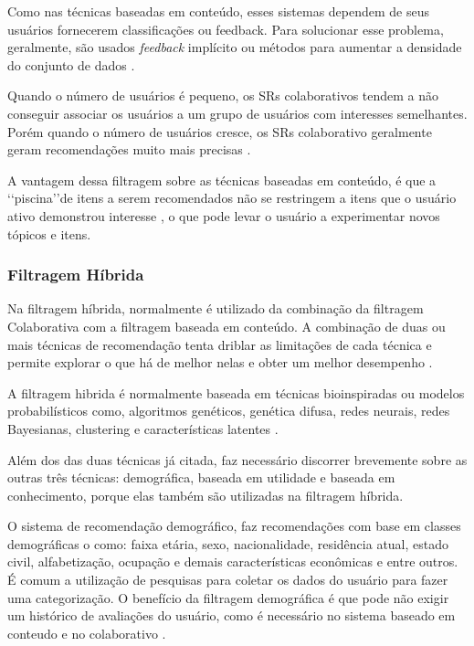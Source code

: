 Como nas técnicas baseadas em conteúdo, esses sistemas dependem de seus usuários fornecerem classificações ou feedback. Para solucionar 
esse problema, geralmente, são usados \emph{feedback} implícito ou métodos para aumentar 
a densidade do conjunto de dados \cite{paulson2003}.

Quando o número de usuários é pequeno, os SRs colaborativos tendem a não conseguir associar 
os usuários a um grupo de usuários com interesses semelhantes. Porém quando o 
número de usuários cresce, os SRs colaborativo geralmente geram recomendações muito mais 
precisas \cite{mauricio}. 

A vantagem dessa filtragem sobre as técnicas baseadas em conteúdo, é que a \lq\lq piscina\rq\rq  de itens a serem recomendados 
não se restringem a itens que o usuário ativo demonstrou interesse \cite{paulson2003}, o que pode levar o usuário a experimentar novos tópicos e itens.


\subsubsection{Filtragem Híbrida}

Na filtragem híbrida, normalmente é utilizado da combinação da filtragem Colaborativa com a filtragem 
baseada em conteúdo\cite{bobadilla2013}. A combinação de duas ou mais técnicas de recomendação tenta driblar as limitações de cada 
técnica e permite explorar o que há de melhor nelas e obter um melhor desempenho \cite{burke2002}. 

A filtragem hibrida é normalmente baseada em técnicas bioinspiradas ou modelos probabilísticos como, 
algoritmos genéticos, genética difusa, redes neurais, redes Bayesianas, clustering e características latentes  \cite{bobadilla2013}.

Além dos das duas técnicas já citada, faz necessário discorrer brevemente sobre as outras três técnicas: demográfica, baseada em utilidade e baseada em conhecimento, porque 
elas também são utilizadas na filtragem híbrida.


O sistema de recomendação demográfico, faz recomendações com base em classes demográficas \cite{burke2002}o
como: faixa etária, sexo, nacionalidade, residência atual, estado civil, 
alfabetização, ocupação e demais características econômicas e entre outros. É comum a utilização de pesquisas para 
coletar os  dados do usuário para fazer uma categorização. O benefício da filtragem demográfica é que
pode não exigir um histórico de avaliações do usuário, como é necessário no sistema baseado em conteudo e no colaborativo \cite{burke2002}.

